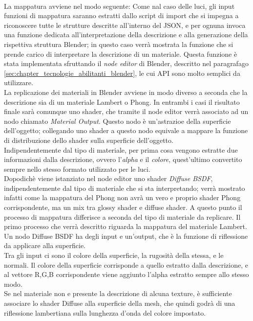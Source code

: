 \\
La mappatura avviene nel modo seguente: 
Come nal caso delle luci, gli input funzioni di mappatura saranno estratti dallo script di import che si impegna a riconoscere tutte le strutture descritte all’interno del JSON, e per ognuna invoca una funzione dedicata all’interpretazione della descrizione e alla generazione della rispettiva struttura Blender; in questo caso verrà mostrata la funzione che si prende carico di interpretare la descrizione di un materiale. Questa funzione è stata implementata sfruttando il \emph{node editor} di Blender, descritto nel paragrafago \ref{sec:chapter_tecnologie_abilitanti_blender}, le cui API sono molto semplici da utilizzare.
\\
La replicazione dei materiali in Blender avviene in modo diverso a seconda che la descrizione sia di un materiale Lambert o Phong. In entrambi i casi il risultato finale sarà comunque uno shader, che tramite il node editor verrà associato ad un nodo chiamato \emph{Material Output}. Questo nodo è un’astrazioe della superficie dell’oggetto; collegando uno shader a questo nodo equivale a mappare la funzione di distribuzione dello shader sulla superficie dell’oggetto.
\\
Indipendentemente dal tipo di materiale, per prima cosa vengono estratte due informazioni dalla descrizione, ovvero l’\emph{alpha} e il \emph{colore}, quest’ultimo convertito sempre nello stesso formato utilizzato per le luci. 
\\
Dopodichè viene istanziato nel node editor uno shader \emph{Diffuse BSDF}, indipendentemente dal tipo di materiale che si sta interpretando; verrà mostrato infatti come la mappatura del Phong non avrà un vero e proprio shader Phong corrispondente, ma un mix tra glossy shader e diffuse shader.
A questo punto il processo di mappatura differisce a seconda del tipo di materiale da replicare. Il primo processo che verrà descritto riguarda la mappatura del materiale Lambert.
Un nodo Diffuse BSDF ha degli input e un’output, che è la funzione di riflessione da applicare alla superficie.
\\
Tra gli input ci sono il colore della superficie, la rugosità della stessa, e le normali. Il colore della superficie corrisponde a quello estratto dalla descrizione, e al vettore R,G,B corrispondente viene aggiunto l’alpha estratto sempre allo stesso modo.
\\
Se nel materiale non e presente la descrizione di alcuna texture, è sufficiente associare lo shader Diffuse alla superficie della mesh, che quindi godrà di una riflessione lambertiana sulla lunghezza d’onda del colore impostato. 
